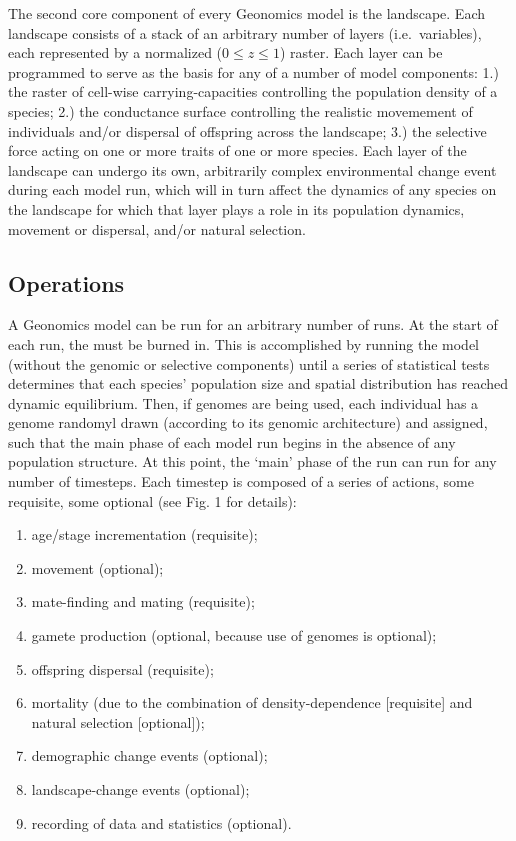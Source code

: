 ﻿\documentclass{article}
\begin{document}
The second core component of every Geonomics model is the landscape.
Each landscape consists of a stack of an arbitrary number of layers (i.e.\ variables),
each represented by a normalized ($0 \leq z \leq 1$) raster.
Each layer can be programmed to serve as the basis for any of a number of model components:
1.) the raster of cell-wise carrying-capacities controlling the population density of a species;
2.) the conductance surface controlling the realistic movemement of individuals and/or 
dispersal of offspring across the landscape;
3.) the selective force acting on one or more traits  of one or more species.
Each layer of the landscape can undergo its own, arbitrarily complex environmental
change event during each model run, which will in turn affect the dynamics
of any species on the landscape for which that layer plays a role in its
population dynamics, movement or dispersal, and/or natural selection.

\subsection{Operations}
A Geonomics model can be run for an arbitrary number of runs.
At the start of each run, the must be burned in.
This is accomplished by running the model (without the genomic or
selective components) until a series of statistical tests determines that each species'
population size and spatial distribution has reached dynamic equilibrium.
Then, if genomes are being used, each individual has a genome randomyl drawn
(according to its genomic architecture) and assigned, such that the main phase
of each model run begins in the absence of any population structure.
At this point, the `main' phase of the run can run for any number of timesteps. 
Each timestep is composed of a series of actions, some requisite, some optional (see Fig. 1 for details):
\begin{enumerate}
  \item age/stage incrementation (requisite);
  \item movement (optional);
  \item mate-finding and  mating (requisite);
  \item gamete production (optional, because use of genomes is optional);
  \item offspring dispersal (requisite);
  \item mortality (due to the combination of density-dependence [requisite] and natural selection [optional]);
  \item demographic change events (optional);
  \item landscape-change events (optional);
  \item recording of data and statistics (optional). 
\end{enumerate}
\end{document}
